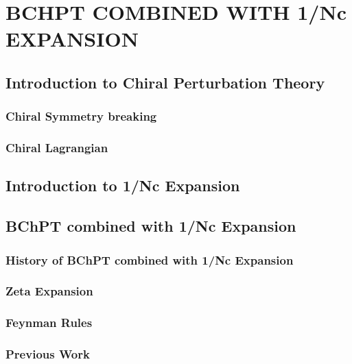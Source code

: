 \chapter{BCHPT COMBINED WITH 1/Nc EXPANSION}

\section{Introduction to Chiral Perturbation Theory}

\subsection{Chiral Symmetry breaking}
\subsection{Chiral Lagrangian}




\section{Introduction to 1/Nc Expansion}


\section{BChPT combined with 1/Nc Expansion}

\subsection{History of BChPT combined with 1/Nc Expansion}
\subsection{Zeta Expansion}
\subsection{Feynman Rules}
\subsection{Previous Work}


